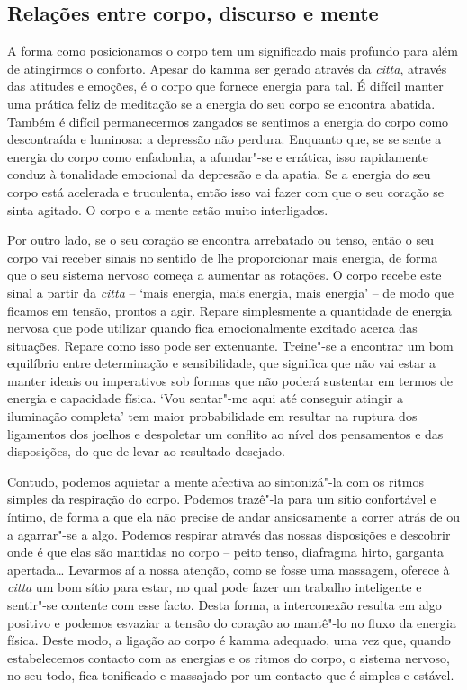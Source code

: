 \subsection{Relações entre corpo, discurso e mente}

A forma como posicionamos o corpo tem um significado mais profundo para além de
atingirmos o conforto. Apesar do kamma ser gerado através da \emph{citta},
através das atitudes e emoções, é o corpo que fornece energia para tal. É
difícil manter uma prática feliz de meditação se a energia do seu corpo se
encontra abatida. Também é difícil permanecermos zangados se sentimos a energia
do corpo como descontraída e luminosa: a depressão não perdura. Enquanto que, se
se sente a energia do corpo como enfadonha, a afundar"-se e errática, isso
rapidamente conduz à tonalidade emocional da depressão e da apatia. Se a energia
do seu corpo está acelerada e truculenta, então isso vai fazer com que o seu
coração se sinta agitado. O corpo e a mente estão muito interligados.

Por outro lado, se o seu coração se encontra arrebatado ou tenso, então o seu
corpo vai receber sinais no sentido de lhe proporcionar mais energia, de forma
que o seu sistema nervoso começa a aumentar as rotações. O corpo recebe este
sinal a partir da \emph{citta} -- `mais energia, mais energia, mais energia' --
de modo que ficamos em tensão, prontos a agir. Repare simplesmente a quantidade
de energia nervosa que pode utilizar quando fica emocionalmente excitado acerca
das situações. Repare como isso pode ser extenuante. Treine"-se a encontrar um
bom equilíbrio entre determinação e sensibilidade, que significa que não vai
estar a manter ideais ou imperativos sob formas que não poderá sustentar em
termos de energia e capacidade física. `Vou sentar"-me aqui até conseguir atingir
a iluminação completa' tem maior probabilidade em resultar na ruptura dos
ligamentos dos joelhos e despoletar um conflito ao nível dos pensamentos e das
disposições, do que de levar ao resultado desejado.

Contudo, podemos aquietar a mente afectiva ao sintonizá"-la com os ritmos simples
da respiração do corpo. Podemos trazê"-la para um sítio confortável e íntimo, de
forma a que ela não precise de andar ansiosamente a correr atrás de ou a
agarrar"-se a algo. Podemos respirar através das nossas disposições e descobrir
onde é que elas são mantidas no corpo -- peito tenso, diafragma hirto, garganta
apertada\ldots{} Levarmos aí a nossa atenção, como se fosse uma massagem,
oferece à \emph{citta} um bom sítio para estar, no qual pode fazer um trabalho
inteligente e sentir"-se contente com esse facto. Desta forma, a interconexão
resulta em algo positivo e podemos esvaziar a tensão do coração ao mantê"-lo no
fluxo da energia física. Deste modo, a ligação ao corpo é kamma adequado, uma
vez que, quando estabelecemos contacto com as energias e os ritmos do corpo, o
sistema nervoso, no seu todo, fica tonificado e massajado por um contacto que é
simples e estável.

